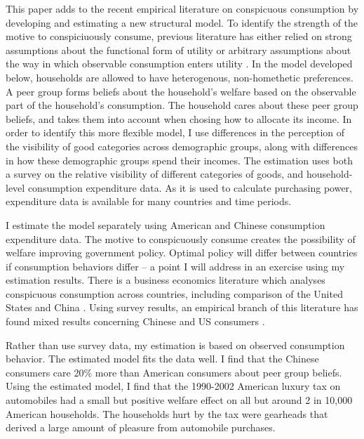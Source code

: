 \documentclass[12pt]{article}
\begin{document}
This paper adds to the recent empirical literature on conspicuous consumption by developing and estimating a new structural model.  To identify the strength of the motive to conspiciuously consume, previous literature has either relied on strong assumptions about the functional form of utility or arbitrary assumptions about the way in which observable consumption enters utility \citep{Heffetz2011, perez2013measuring}.  In the model developed below, households are allowed to have heterogenous, non-homethetic preferences.  A peer group forms beliefs about the household's welfare based on the observable part of the household's consumption.  The household cares about these peer group beliefs, and takes them into account when chosing how to allocate its income.  In order to identify this more flexible model, I use differences in the perception of the visibility of good categories across demographic groups, along with differences in how these demographic groups spend their incomes. The estimation uses both a survey on the relative visibility of different categories of goods, and household-level consumption expenditure data.  As it is used to calculate purchasing power, expenditure data is available for many countries and time periods.

I estimate the model separately using American and Chinese consumption expenditure data.  The motive to conspicuously consume creates the possibility of welfare improving government policy.  Optimal policy will differ between countries if consumption behaviors differ -- a point I will address in an exercise using my estimation results.  There is a business economics literature which analyses conspicuous consumption across countries, including comparison of the United States and China \citep{wong1998personal}.  Using survey results, an empirical branch of this literature has found mixed results concerning Chinese and US consumers \citep{podoshen2011materialism}.

Rather than use survey data, my estimation is based on observed consumption behavior. The estimated model fits the data well.  I find that the Chinese consumers care 20\% more than American consumers about peer group beliefs.  Using the estimated model, I find that the 1990-2002 American luxury tax on automobiles had a small but positive welfare effect on all but around 2 in 10,000 American households.  The households hurt by the tax were gearheads that derived a large amount of pleasure from automobile purchases.
\end{document}
